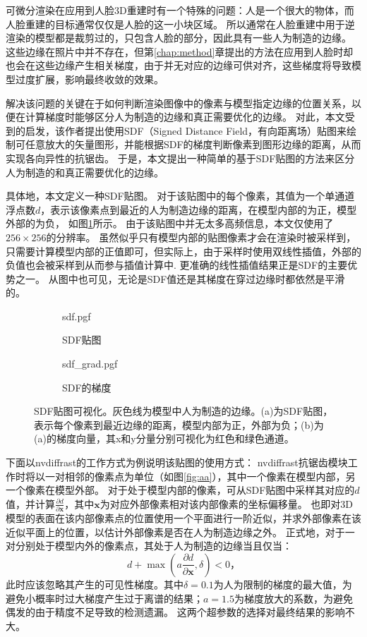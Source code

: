 可微分渲染在应用到人脸3D重建时有一个特殊的问题：人是一个很大的物体，而人脸重建的目标通常仅仅是人脸的这一小块区域。
所以通常在人脸重建中用于逆渲染的模型都是裁剪过的，只包含人脸的部分，因此具有一些人为制造的边缘。
这些边缘在照片中并不存在，但第\ref{chap:method}章提出的方法在应用到人脸时却也会在这些边缘产生相关梯度，由于并无对应的边缘可供对齐，这些梯度将导致模型过度扩展，影响最终收敛的效果。

解决该问题的关键在于如何判断渲染图像中的像素与模型指定边缘的位置关系，以便在计算梯度时能够区分人为制造的边缘和真正需要优化的边缘。
对此，本文受到\citet{sdf_glyphs}的启发，该作者提出使用SDF（Signed Distance Field，有向距离场）贴图来绘制可任意放大的矢量图形，并能根据SDF的梯度判断像素到图形边缘的距离，从而实现各向异性的抗锯齿。
于是，本文提出一种简单的基于SDF贴图的方法来区分人为制造的和真正需要优化的边缘。

具体地，本文定义一种SDF贴图。
对于该贴图中的每个像素，其值为一个单通道浮点数$d$，表示该像素点到最近的人为制造边缘的距离，在模型内部的为正，模型外部的为负，
如图\ref{fig:sdf}所示。
由于该贴图中并无太多高频信息，本文仅使用了$256 \times 256$的分辨率。
虽然似乎只有模型内部的贴图像素才会在渲染时被采样到，只需要计算模型内部的正值即可，但实际上，由于采样时使用双线性插值，外部的负值也会被采样到从而参与插值计算中.
更准确的线性插值结果正是SDF的主要优势之一。
从图中也可见，无论是SDF值还是其梯度在穿过边缘时都依然是平滑的。

\begin{figure}
\centering
\begin{subfigure}[t]{3.3in}
    \centering
    {sdf.pgf}
    \caption{SDF贴图}
    \label{fig:sdf}
\end{subfigure}
\begin{subfigure}[t]{2.9in}
    \centering
    {sdf_grad.pgf}
    \caption{SDF的梯度}
    \label{fig:sdf_grad}
\end{subfigure}
\caption[SDF贴图可视化]{SDF贴图可视化。灰色线为模型中人为制造的边缘。(a)为SDF贴图，表示每个像素到最近边缘的距离，模型内部为正，外部为负；(b)为(a)的梯度向量，其x和y分量分别可视化为红色和绿色通道。}
\end{figure}

下面以nvdiffrast的工作方式为例说明该贴图的使用方式：
nvdiffrast抗锯齿模块工作时将以一对相邻的像素点为单位（如图\ref{fig:aa}），其中一个像素在模型内部，另一个像素在模型外部。
对于处于模型内部的像素，可从SDF贴图中采样其对应的$d$值，并计算$\frac{\partial d}{\partial \mathbf{x}}$，其中$\mathbf{x}$为对应外部像素相对该内部像素的坐标偏移量。
也即对3D模型的表面在该内部像素点的位置使用一个平面进行一阶近似，并求外部像素在该近似平面上的位置，以估计外部像素是否在人为制造边缘之外。
正式地，对于一对分别处于模型内外的像素点，其处于人为制造的边缘当且仅当：
\begin{equation}
    d + \max\left(a\frac{\partial d}{\partial \mathbf{x}}, \delta\right) < 0
    \text{，}
\end{equation}
此时应该忽略其产生的可见性梯度。其中$\delta=0.1$为人为限制的梯度的最大值，为避免小概率时过大梯度产生过于离谱的结果；$a=1.5$为梯度放大的系数，为避免偶发的由于精度不足导致的检测遗漏。
这两个超参数的选择对最终结果的影响不大。


